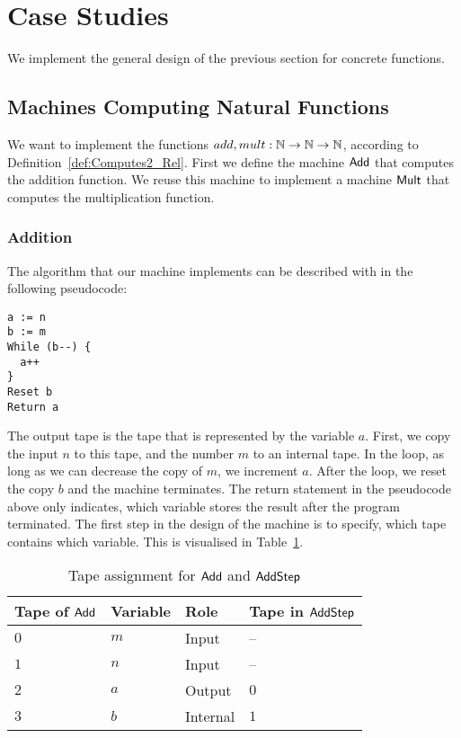 \section{Case Studies}
\label{sec:case-studies}

We implement the general design of the previous section for concrete functions.

\subsection{Machines Computing Natural Functions}
\label{sec:NatTM}

We want to implement the functions $add,mult:\mathbb{N}\rightarrow\mathbb{N}\rightarrow\mathbb{N}$, according to Definition~\ref{def:Computes2_Rel}.  First we define the machine
$\mathsf{Add}$ that computes the addition function.  We reuse this machine to implement a machine $\mathsf{Mult}$ that computes the multiplication function.

\subsubsection{Addition}
\label{sec:Add}

The algorithm that our machine implements can be described with in the following pseudocode:
{
  \small
\begin{lstlisting}[style=pseudocode]
a := n
b := m
While (b--) {
  a++
}
Reset b
Return a
\end{lstlisting}
}
The output tape is the tape that is represented by the variable $a$.  First, we copy the input $n$ to this tape, and the number $m$ to an internal
tape.  In the loop, as long as we can decrease the copy of $m$, we increment $a$.  After the loop, we reset the copy $b$ and the machine terminates.
The return statement in the pseudocode above only indicates, which variable stores the result after the program terminated.  The first step in the
design of the machine is to specify, which tape contains which variable.  This is visualised in Table~\ref{tab:tapes-Add}.

\begin{table}[h]
  \centering
  \begin{tabular}{|l|l|l|l|}
    \hline
     Tape of $\mathsf{Add}$ & Variable & Role      & Tape in $\mathsf{AddStep}$ \\ \hline\hline
     $0$                & $m$      & Input     & --                     \\ \hline
     $1$                & $n$      & Input     & --                     \\ \hline
     $2$                & $a$      & Output    & $0$                    \\ \hline
     $3$                & $b$      & Internal  & $1$                    \\ \hline
  \end{tabular}
  \caption{Tape assignment for $\mathsf{Add}$ and $\mathsf{AddStep}$}
  \label{tab:tapes-Add}
\end{table}


